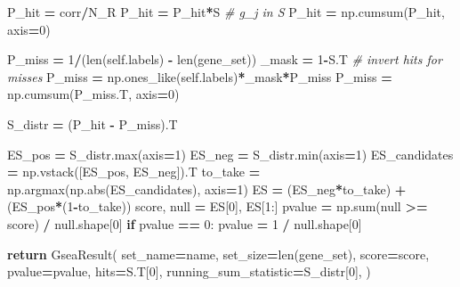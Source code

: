 \documentclass[
]{book}
\newenvironment{Shaded}{\begin{snugshade}}{\end{snugshade}}
\newcommand{\BuiltInTok}[1]{#1}
\newcommand{\CommentTok}[1]{\textcolor[rgb]{0.56,0.35,0.01}{\textit{#1}}}
\newcommand{\ControlFlowTok}[1]{\textcolor[rgb]{0.13,0.29,0.53}{\textbf{#1}}}
\newcommand{\DecValTok}[1]{\textcolor[rgb]{0.00,0.00,0.81}{#1}}
\newcommand{\NormalTok}[1]{#1}
\newcommand{\OperatorTok}[1]{\textcolor[rgb]{0.81,0.36,0.00}{\textbf{#1}}}
\newcommand{\VariableTok}[1]{\textcolor[rgb]{0.00,0.00,0.00}{#1}}
\begin{document}
\begin{Shaded}
\begin{Highlighting}[numbers=left,,]
\NormalTok{        P\_hit }\OperatorTok{=}\NormalTok{ corr}\OperatorTok{/}\NormalTok{N\_R}
\NormalTok{        P\_hit }\OperatorTok{=}\NormalTok{ P\_hit}\OperatorTok{*}\NormalTok{S }\CommentTok{\# g\_j in S}
\NormalTok{        P\_hit }\OperatorTok{=}\NormalTok{ np.cumsum(P\_hit, axis}\OperatorTok{=}\DecValTok{0}\NormalTok{)}

\NormalTok{        P\_miss }\OperatorTok{=} \DecValTok{1}\OperatorTok{/}\NormalTok{(}\BuiltInTok{len}\NormalTok{(}\VariableTok{self}\NormalTok{.labels) }\OperatorTok{{-}} \BuiltInTok{len}\NormalTok{(gene\_set))}
\NormalTok{        \_mask }\OperatorTok{=} \DecValTok{1}\OperatorTok{{-}}\NormalTok{S.T }\CommentTok{\# invert hits for misses}
\NormalTok{        P\_miss }\OperatorTok{=}\NormalTok{ np.ones\_like(}\VariableTok{self}\NormalTok{.labels)}\OperatorTok{*}\NormalTok{\_mask}\OperatorTok{*}\NormalTok{P\_miss}
\NormalTok{        P\_miss }\OperatorTok{=}\NormalTok{ np.cumsum(P\_miss.T, axis}\OperatorTok{=}\DecValTok{0}\NormalTok{)}

\NormalTok{        S\_distr }\OperatorTok{=}\NormalTok{ (P\_hit }\OperatorTok{{-}}\NormalTok{ P\_miss).T}

\NormalTok{        ES\_pos }\OperatorTok{=}\NormalTok{ S\_distr.}\BuiltInTok{max}\NormalTok{(axis}\OperatorTok{=}\DecValTok{1}\NormalTok{)}
\NormalTok{        ES\_neg }\OperatorTok{=}\NormalTok{ S\_distr.}\BuiltInTok{min}\NormalTok{(axis}\OperatorTok{=}\DecValTok{1}\NormalTok{)}
\NormalTok{        ES\_candidates }\OperatorTok{=}\NormalTok{ np.vstack([ES\_pos, ES\_neg]).T}
\NormalTok{        to\_take }\OperatorTok{=}\NormalTok{ np.argmax(np.}\BuiltInTok{abs}\NormalTok{(ES\_candidates), axis}\OperatorTok{=}\DecValTok{1}\NormalTok{)}
\NormalTok{        ES }\OperatorTok{=}\NormalTok{ (ES\_neg}\OperatorTok{*}\NormalTok{to\_take) }\OperatorTok{+}\NormalTok{ (ES\_pos}\OperatorTok{*}\NormalTok{(}\DecValTok{1}\OperatorTok{{-}}\NormalTok{to\_take))}
\NormalTok{        score, null }\OperatorTok{=}\NormalTok{ ES[}\DecValTok{0}\NormalTok{], ES[}\DecValTok{1}\NormalTok{:]}
\NormalTok{        pvalue }\OperatorTok{=}\NormalTok{ np.}\BuiltInTok{sum}\NormalTok{(null }\OperatorTok{\textgreater{}=}\NormalTok{ score) }\OperatorTok{/}\NormalTok{ null.shape[}\DecValTok{0}\NormalTok{]}
        \ControlFlowTok{if}\NormalTok{ pvalue }\OperatorTok{==} \DecValTok{0}\NormalTok{:}
\NormalTok{            pvalue }\OperatorTok{=} \DecValTok{1} \OperatorTok{/}\NormalTok{ null.shape[}\DecValTok{0}\NormalTok{]}

        \ControlFlowTok{return}\NormalTok{ GseaResult(}
\NormalTok{            set\_name}\OperatorTok{=}\NormalTok{name,}
\NormalTok{            set\_size}\OperatorTok{=}\BuiltInTok{len}\NormalTok{(gene\_set),}
\NormalTok{            score}\OperatorTok{=}\NormalTok{score,}
\NormalTok{            pvalue}\OperatorTok{=}\NormalTok{pvalue,}
\NormalTok{            hits}\OperatorTok{=}\NormalTok{S.T[}\DecValTok{0}\NormalTok{],}
\NormalTok{            running\_sum\_statistic}\OperatorTok{=}\NormalTok{S\_distr[}\DecValTok{0}\NormalTok{],}
\NormalTok{        )}
    

\end{Highlighting}
\end{Shaded}
\end{document}
